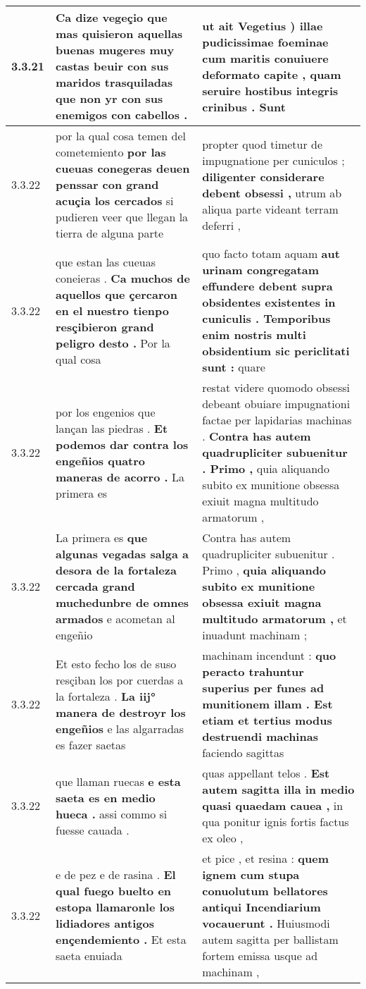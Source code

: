 \begin{tabular}{|p{1cm}|p{6.5cm}|p{6.5cm}|}
3.3.21 & Ca dize vegeçio \textbf{ que mas quisieron aquellas buenas mugeres muy castas beuir con sus maridos trasquiladas } que non yr con sus enemigos con cabellos . & ut ait Vegetius ) illae pudicissimae foeminae \textbf{ cum maritis conuiuere deformato capite , } quam seruire hostibus integris crinibus . Sunt \\\hline
3.3.22 & por la qual cosa temen del cometemiento \textbf{ por las cueuas conegeras deuen penssar con grand acuçia los cercados } si pudieren veer que llegan la tierra de alguna parte & propter quod timetur de impugnatione per cuniculos ; \textbf{ diligenter considerare debent obsessi , } utrum ab aliqua parte videant terram deferri , \\\hline
3.3.22 & que estan las cueuas coneieras . \textbf{ Ca muchos de aquellos que çercaron en el nuestro tienpo resçibieron grand peligro desto . } Por la qual cosa & quo facto totam aquam \textbf{ aut urinam congregatam effundere debent supra obsidentes existentes in cuniculis . Temporibus enim nostris multi obsidentium sic periclitati sunt : } quare \\\hline
3.3.22 & por los engenios que lançan las piedras . \textbf{ Et podemos dar contra los engeñios quatro maneras de acorro . } La primera es & restat videre quomodo obsessi debeant obuiare impugnationi factae per lapidarias machinas . \textbf{ Contra has autem quadrupliciter subuenitur . Primo , } quia aliquando subito ex munitione obsessa exiuit magna multitudo armatorum , \\\hline
3.3.22 & La primera es \textbf{ que algunas vegadas salga a desora de la fortaleza cercada grand muchedunbre de omnes armados } e acometan al engeñio & Contra has autem quadrupliciter subuenitur . Primo , \textbf{ quia aliquando subito ex munitione obsessa exiuit magna multitudo armatorum , } et inuadunt machinam ; \\\hline
3.3.22 & Et esto fecho los de suso resçiban los por cuerdas a la fortaleza . \textbf{ La iij° manera de destroyr los engeñios } e las algarradas es fazer saetas & machinam incendunt : \textbf{ quo peracto trahuntur superius per funes ad munitionem illam . Est etiam et tertius modus destruendi machinas } faciendo sagittas \\\hline
3.3.22 & que llaman ruecas \textbf{ e esta saeta es en medio hueca . } assi commo si fuesse cauada . & quas appellant telos . \textbf{ Est autem sagitta illa in medio quasi quaedam cauea , } in qua ponitur ignis fortis factus ex oleo , \\\hline
3.3.22 & e de pez e de rasina . \textbf{ El qual fuego buelto en estopa llamaronle los lidiadores antigos ençendemiento . } Et esta saeta enuiada & et pice , et resina : \textbf{ quem ignem cum stupa conuolutum bellatores antiqui Incendiarium vocauerunt . } Huiusmodi autem sagitta per ballistam fortem emissa usque ad machinam , \\\hline

\end{tabular}
